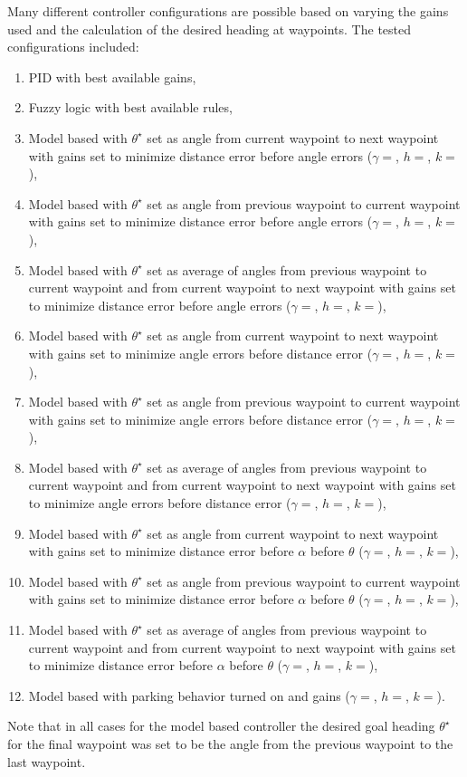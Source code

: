 Many different controller configurations are possible based on varying the gains used and the calculation of the desired heading at waypoints. The tested configurations included:
\begin{enumerate}
\item PID with best available gains,
\item Fuzzy logic with best available rules,
\item Model based with $\theta^\star$ set as angle from current waypoint to next waypoint with gains set to minimize distance error before angle errors ($\gamma = $, $h = $, $k = $),
\item Model based with $\theta^\star$ set as angle from previous waypoint to current waypoint with gains set to minimize distance error before angle errors ($\gamma = $, $h = $, $k = $),
\item Model based with $\theta^\star$ set as average of angles from previous waypoint to current waypoint and from current waypoint to next waypoint with gains set to minimize distance error before angle errors ($\gamma = $, $h = $, $k = $),
\item Model based with $\theta^\star$ set as angle from current waypoint to next waypoint with gains set to minimize angle errors before distance error ($\gamma = $, $h = $, $k = $),
\item Model based with $\theta^\star$ set as angle from previous waypoint to current waypoint with gains set to minimize angle errors before distance error ($\gamma = $, $h = $, $k = $),
\item Model based with $\theta^\star$ set as average of angles from previous waypoint to current waypoint and from current waypoint to next waypoint with gains set to minimize angle errors before distance error ($\gamma = $, $h = $, $k = $),
\item Model based with $\theta^\star$ set as angle from current waypoint to next waypoint with gains set to minimize distance error before $\alpha$ before $\theta$ ($\gamma = $, $h = $, $k = $),
\item Model based with $\theta^\star$ set as angle from previous waypoint to current waypoint with gains set to minimize distance error before $\alpha$ before $\theta$ ($\gamma = $, $h = $, $k = $),
\item Model based with $\theta^\star$ set as average of angles from previous waypoint to current waypoint and from current waypoint to next waypoint with gains set to minimize distance error before $\alpha$ before $\theta$ ($\gamma = $, $h = $, $k = $),
\item Model based with parking behavior turned on and gains ($\gamma = $, $h = $, $k = $).
\end{enumerate}
Note that in all cases for the model based controller the desired goal heading $\theta^\star$ for the final waypoint was set to be the angle from the previous waypoint to the last waypoint.

